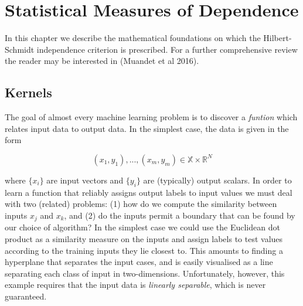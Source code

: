 \chapter{Statistical Measures of Dependence}
\label{hsic}

In this chapter we describe the mathematical foundations on which the Hilbert-Schmidt independence criterion is prescribed. For a further comprehensive review the reader may be interested in (Muandet et al 2016). 


\section{Kernels}

The goal of almost every machine learning problem is to discover a \textit{funtion} which relates input data to output data. In the simplest case, the data is given in the form 

\begin{equation}
(x_1, y_1), ..., (x_m, y_m) \in \mathbb{X} \times \mathbb{R}^N
\end{equation}

\noindent where $\{x_i\}$ are input vectors and $\{y_i\}$ are (typically) output scalars. In order to learn a function that reliably assigns output labels to input values we must deal with two (related) problems: (1) how do we compute the similarity between inputs $x_j$ and $x_k$, and (2) do the inputs permit a boundary that can be found by our choice of algorithm? In the simplest case we could use the Euclidean dot product as a similarity measure on the inputs and assign labels to test values according to the training inputs they lie closest to. This amounts to finding a hyperplane that separates the input cases, and is easily visualised as a line separating each class of input in two-dimensions. Unfortunately, however, this example requires that the input data is \textit{linearly separable}, which is never guaranteed. \\


